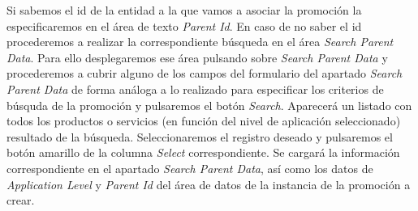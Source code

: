 \begin{description}
Si sabemos el id de la entidad a la que vamos a asociar la promoción la especificaremos en el área de texto \emph{Parent Id}. En caso de no saber el id procederemos a realizar la correspondiente búsqueda en el área  \emph{Search Parent Data}. Para ello desplegaremos ese área pulsando sobre \emph{Search Parent Data} y procederemos a cubrir alguno de los campos del formulario del apartado \emph{Search Parent Data} de forma análoga a lo realizado para especificar los criterios de búsquda de la promoción y pulsaremos el botón \emph{Search}. Aparecerá un listado con todos los productos o servicios (en función del nivel de aplicación seleccionado) resultado de la búsqueda. Seleccionaremos el registro deseado y pulsaremos el botón amarillo de la columna \emph{Select} correspondiente. Se cargará la información correspondiente en el apartado \emph{Search Parent Data}, así como los datos de \emph{Application Level} y \emph{Parent Id} del área de datos de la instancia de la promoción a crear.


\end{description}
